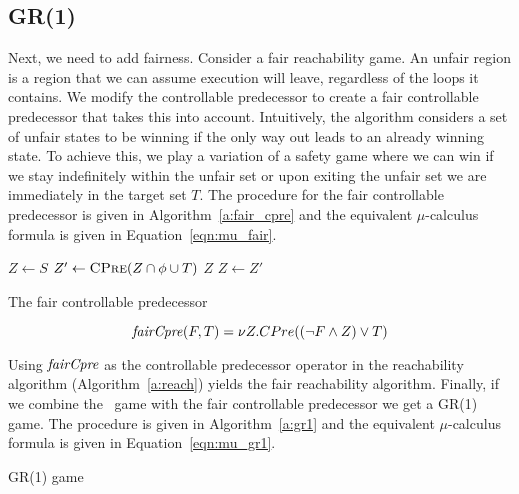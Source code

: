 \subsection{GR(1)}

Next, we need to add fairness. Consider a fair reachability game. An unfair region is a region that we can assume execution will leave, regardless of the loops it contains. We modify the controllable predecessor to create a fair controllable predecessor that takes this into account. Intuitively, the algorithm considers a set of unfair states to be winning if the only way out leads to an already winning state. To achieve this, we play a variation of a safety game where we can win if we stay indefinitely within the unfair set or upon exiting the unfair set we are immediately in the target set $T$. The procedure for the fair controllable predecessor is given in Algorithm~\ref{a:fair_cpre} and the equivalent $\mu$-calculus formula is given in Equation~\ref{eqn:mu_fair}. 

\begin{algorithm}[t]
\begin{algorithmic}
\State $Z \gets S$
\Loop
\State $Z' \gets \Call{CPre}{Z \cap \phi \cup T}$
\State\Return $Z$\EndIf
\State $Z \gets Z'$
\EndLoop
\EndFunction
\end{algorithmic}
\caption{The fair controllable predecessor}
\label{a:fair_cpre}
\end{algorithm}

\begin{equation}
    \mathit{fairCpre}(F, T) = \nu Z. CPre((\neg F \wedge Z) \vee T)
\label{eqn:mu_fair}
\end{equation}

Using $\mathit{fairCpre}$ as the controllable predecessor operator in the reachability algorithm (Algorithm~\ref{a:reach}) yields the fair reachability algorithm. Finally, if we combine the \buchi\ game with the fair controllable predecessor we get a GR(1) game. The procedure is given in Algorithm~\ref{a:gr1} and the equivalent $\mu$-calculus formula is given in Equation~\ref{eqn:mu_gr1}.

\begin{algorithm}[t]
\begin{algorithmic}
\State\Return {}
\EndFunction
\end{algorithmic}
\caption{GR(1) game}
\label{a:gr1}
\end{algorithm}

